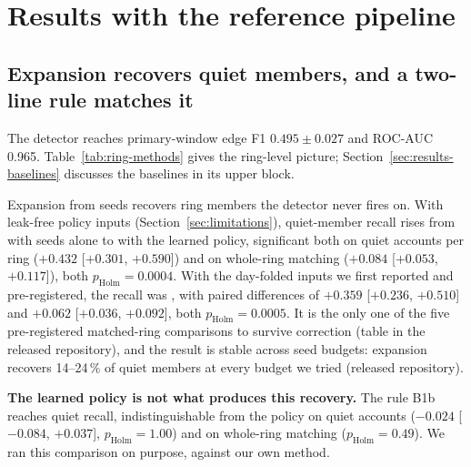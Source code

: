 \section{Results with the reference pipeline}
\label{sec:results}

\subsection{Expansion recovers quiet members, and a two-line rule matches it}
\label{sec:results-expansion}

The detector reaches primary-window edge F1 $0.495 \pm 0.027$ and ROC-AUC 0.965.
Table~\ref{tab:ring-methods} gives the ring-level picture; Section~\ref{sec:results-baselines}
discusses the baselines in its upper block.



Expansion from seeds recovers ring members the detector never fires on. With leak-free policy
inputs (Section~\ref{sec:limitations}), quiet-member recall rises from 
with seeds alone to  with the learned policy, significant both on quiet
accounts per ring ($+0.432$ [$+0.301$, $+0.590$]) and on whole-ring matching ($+0.084$ [$+0.053$,
$+0.117$]), both $p_{\mathrm{Holm}}=0.0004$.
With the day-folded inputs we first reported and pre-registered, the recall was
, with paired differences of $+0.359$ [$+0.236$, $+0.510$] and $+0.062$
[$+0.036$, $+0.092$], both $p_{\mathrm{Holm}}=0.0005$.
It is the only one of the five pre-registered matched-ring comparisons to survive correction
(table in the released repository), and the result is stable across seed budgets: expansion
recovers 14--24\,\% of quiet members at every budget we tried
(released repository).


\textbf{The learned policy is not what produces this recovery.} The rule B1b reaches
 quiet recall, indistinguishable from the policy on quiet accounts
($-0.024$ [$-0.084$, $+0.037$], $p_{\mathrm{Holm}}=1.00$) and on whole-ring matching
($p_{\mathrm{Holm}}=0.49$).
We ran this comparison on purpose, against our own method.


